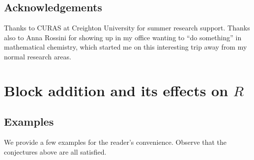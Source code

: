 \documentclass{amsart}
\theoremstyle{definition}
\begin{document}
\subsection*{Acknowledgements}
Thanks to CURAS at Creighton University for summer research support. Thanks also to Anna Rossini for showing up in my office wanting to ``do something'' in mathematical chemistry, which started me on this interesting trip away from my normal research areas.



\section{Block addition and its effects on $R$}\label{sec:induction}

\subsection{Examples}

We provide a few examples for the reader's convenience. Observe that the conjectures above are all satisfied.
\end{document}
